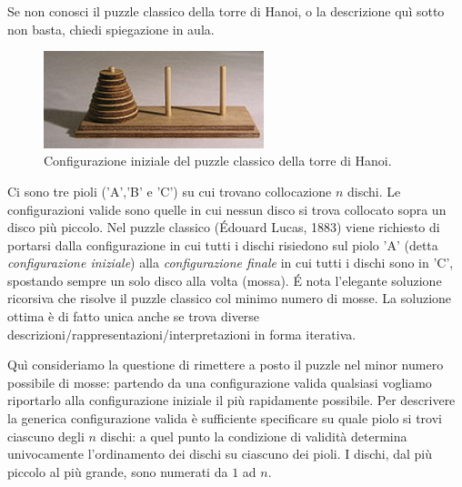 \renewcommand{\nomebreve}{hanoi\_puzzle\_reset}
\renewcommand{\titolo}{Revert the Hanoi puzzle back to its initial configuration}

\introduzione{}

Se non conosci il puzzle classico della torre di Hanoi, o la descrizione quì sotto non basta, chiedi spiegazione in aula.

\begin{figure}[h!]
\begin{center}
  \noindent \includegraphics[width=0.57\textwidth]{figures/220px-Tower_of_Hanoi.jpeg}
\end{center}
\caption{Configurazione iniziale del puzzle classico della torre di Hanoi.}
\end{figure}

Ci sono tre pioli ('A','B' e 'C') su cui trovano collocazione $n$ dischi. Le configurazioni valide sono quelle in cui nessun disco si trova collocato sopra un disco più piccolo.
Nel puzzle classico (Édouard Lucas, 1883) viene richiesto di portarsi dalla configurazione in cui tutti i dischi risiedono sul piolo 'A' (detta \emph{configurazione iniziale}) alla \emph{configurazione finale} in cui tutti i dischi sono in 'C', spostando sempre un solo disco alla volta (mossa).
\'E nota l'elegante soluzione ricorsiva che risolve il puzzle classico col minimo numero di mosse. La soluzione ottima è di fatto unica anche se trova diverse descrizioni/rappresentazioni/interpretazioni in forma iterativa.

\begin{center}
\end{center}

Quì consideriamo la questione di rimettere a posto il puzzle nel minor numero possibile di mosse: partendo da una configurazione valida qualsiasi vogliamo riportarlo alla configurazione iniziale il più rapidamente possibile.
Per descrivere la generica configurazione valida è sufficiente specificare su quale piolo si trovi ciascuno degli $n$ dischi:
a quel punto la condizione di validità determina univocamente l'ordinamento dei dischi su ciascuno dei pioli. I dischi, dal più piccolo al più grande, sono numerati da $1$ ad $n$.

